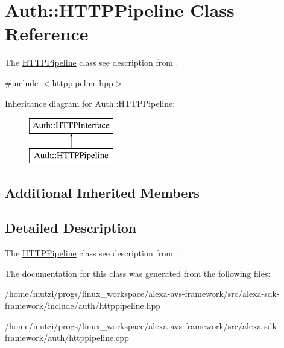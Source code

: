 \hypertarget{classAuth_1_1HTTPPipeline}{}\section{Auth\+:\+:H\+T\+T\+P\+Pipeline Class Reference}
\label{classAuth_1_1HTTPPipeline}


The \hyperlink{classAuth_1_1HTTPPipeline}{H\+T\+T\+P\+Pipeline} class see description from .  




{\ttfamily \#include $<$httppipeline.\+hpp$>$}

Inheritance diagram for Auth\+:\+:H\+T\+T\+P\+Pipeline\+:\begin{figure}[H]
\begin{center}
\leavevmode
\includegraphics[height=2.000000cm]{d7/da1/classAuth_1_1HTTPPipeline}
\end{center}
\end{figure}
\subsection*{Additional Inherited Members}


\subsection{Detailed Description}
The \hyperlink{classAuth_1_1HTTPPipeline}{H\+T\+T\+P\+Pipeline} class see description from . 

The documentation for this class was generated from the following files\+:\begin{DoxyCompactItemize}
\item 
/home/mutzi/progs/linux\+\_\+workspace/alexa-\/avs-\/framework/src/alexa-\/sdk-\/framework/include/auth/httppipeline.\+hpp\item 
/home/mutzi/progs/linux\+\_\+workspace/alexa-\/avs-\/framework/src/alexa-\/sdk-\/framework/auth/httppipeline.\+cpp\end{DoxyCompactItemize}
